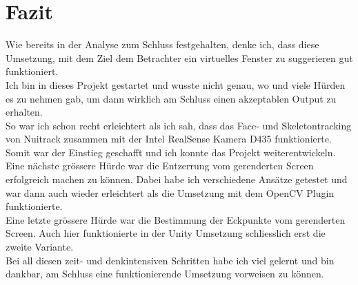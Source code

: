 \section{Fazit}
Wie bereits in der Analyse zum Schluss festgehalten, denke ich, dass diese Umsetzung, mit dem Ziel dem Betrachter ein virtuelles Fenster zu suggerieren gut funktioniert. \\ Ich bin in dieses Projekt gestartet und wusste nicht genau, wo und viele Hürden es zu nehmen gab, um dann wirklich am Schluss einen akzeptablen Output zu erhalten. \\ So war ich schon recht erleichtert als ich sah, dass das Face- und Skeletontracking von Nuitrack zusammen mit der Intel RealSense Kamera D435 funktionierte. Somit war der Einstieg geschafft und ich konnte das Projekt weiterentwickeln. \\ Eine nächste grössere Hürde war die Entzerrung vom gerenderten Screen erfolgreich machen zu können. Dabei habe ich verschiedene Ansätze getestet und war dann auch wieder erleichtert als die Umsetzung mit dem OpenCV Plugin funktionierte. \\ Eine letzte grössere Hürde war die Bestimmung der Eckpunkte vom gerenderten Screen. Auch hier funktionierte in der Unity Umsetzung schliesslich erst die zweite Variante.  \\
Bei all diesen zeit- und denkintensiven Schritten habe ich viel gelernt und bin dankbar, am Schluss eine funktionierende Umsetzung vorweisen zu können.
